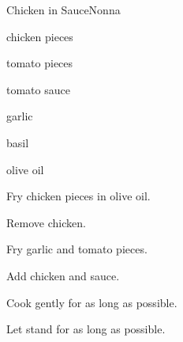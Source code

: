 \begin{recipe}{Chicken in Sauce}{Nonna}{}

\begin{ingredients}
\item chicken pieces
\item tomato pieces
\item tomato sauce
\item garlic
\item basil
\item olive oil
\end{ingredients}

\begin{directions}
\item Fry chicken pieces in olive oil.
\item Remove chicken.
\item Fry garlic and tomato pieces.
\item Add chicken and sauce.
\item Cook gently for as long as possible.
\item Let stand for as long as possible.
\end{directions}

\end{recipe}
